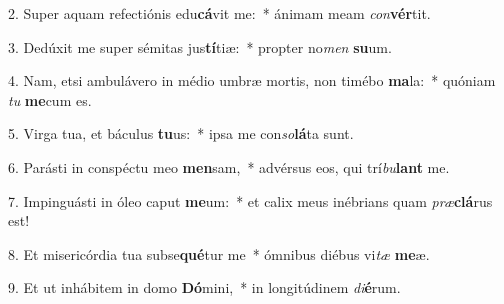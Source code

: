 2. Super aquam refectiónis edu\textbf{cá}vit me:~*  ánimam meam \textit{con}\textbf{vér}tit.\

3. Dedúxit me super sémitas jus\textbf{tí}tiæ:~*  propter no\textit{men} \textbf{su}um.\

4. Nam, etsi ambulávero in médio umbræ mortis, non timébo \textbf{ma}la:~*  quóniam \textit{tu} \textbf{me}cum es.\

5. Virga tua, et báculus \textbf{tu}us:~*  ipsa me con\textit{so}\textbf{lá}ta sunt.\

6. Parásti in conspéctu meo \textbf{men}sam,~*  advérsus eos, qui trí\textit{bu}\textbf{lant} me.\

7. Impinguásti in óleo caput \textbf{me}um:~*  et calix meus inébrians quam \textit{præ}\textbf{clá}rus est!\

8. Et misericórdia tua subse\textbf{qué}tur me~*  ómnibus diébus vi\textit{tæ} \textbf{me}æ.\

9. Et ut inhábitem in domo \textbf{Dó}mini,~*  in longitúdinem \textit{di}\textbf{é}rum.\

